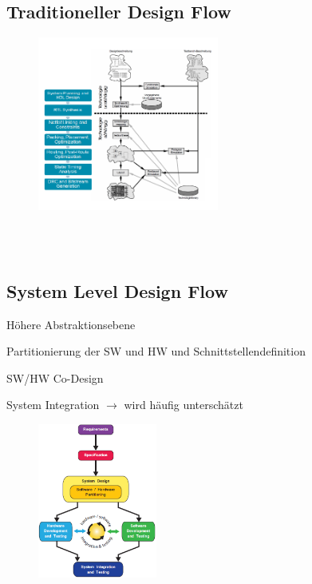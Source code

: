 \begin{multicols}{2}
    \subsection{Traditioneller Design Flow}
     \begin{figure}[H]
     	\includegraphics[width=0.53\textwidth]{images/Design_Flow_traditionell.png}
     \end{figure}
     \ \\ \ \\
    \subsection{System Level Design Flow}
    \begin{compactitem}
        \item Höhere Abstraktionsebene
        \item Partitionierung der SW und HW und Schnittstellendefinition
        \item SW/HW Co-Design
        \item System Integration $\rightarrow$ wird häufig unterschätzt
    \end{compactitem}
    \begin{figure}[H]
     	\includegraphics[width=0.35\textwidth]{images/Design_Flow_System_Level.png}
     \end{figure}
\end{multicols}
